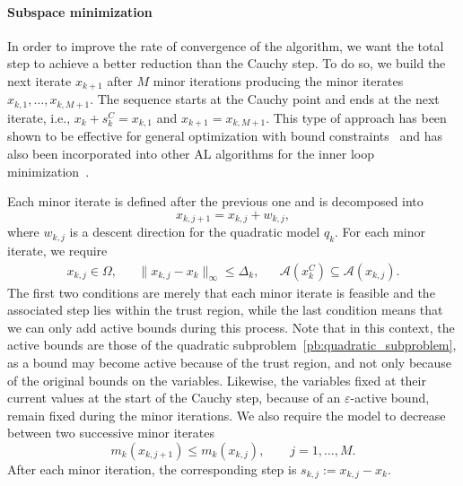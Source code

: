 \documentclass[pdflatex,sn-mathphys-num]{sn-jnl}%
\theoremstyle{thmstyleone}%
\newcommand{\calA}{{\mathcal{A}}}
\begin{document}
\paragraph*{Subspace minimization} In order to improve the rate of convergence of the algorithm, we want the total step to achieve a better reduction than the Cauchy step. To do so, we build the next iterate $x_{k+1}$ after $M$ minor iterations producing the minor iterates $x_{k,1},\ldots,x_{k,M+1}$. The sequence starts at the Cauchy point and ends at the next iterate, i.e., $x_{k}+s_k^C=x_{k,1}$ and $x_{k+1}=x_{k,M+1}$. This type of approach has been shown to be effective for general optimization with bound constraints~\cite{linmore:1999a} and has also been incorporated into other AL algorithms for the inner loop minimization~\cite{conn-etal:1992,arreckx-etal:2016}.

Each minor iterate is defined after the previous one and is decomposed into 
\[x_{k,j+1}=x_{k,j}+w_{k,j},\]
where $w_{k,j}$ is a descent direction for the quadratic model $q_k$. For each minor iterate, we require
\begin{equation}\label{eq:minor_iterate_feasible}
	\begin{aligned}
		x_{k,j} \in \Omega, & & \|x_{k,j} - x_k \|_\infty \le \Delta_k, & & \calA(x_k^C) \subseteq \calA(x_{k,j}).
	\end{aligned}
\end{equation}
The first two conditions are merely that each minor iterate is feasible and the associated step lies within the trust region, while the last condition means that we can only add active bounds during this process. Note that in this context, the active bounds are those of the quadratic subproblem~\eqref{pb:quadratic_subproblem}, as a bound may become active because of the trust region, and not only because of the original bounds on the variables. Likewise, the variables fixed at their current values at the start of the Cauchy step, because of an $\varepsilon$-active bound, remain fixed during the minor iterations.
We also require the model to decrease between two successive minor iterates
\begin{equation}\label{eq:minor_iterate_decrease}
	m_k(x_{k,j+1}) \le m_k(x_{k,j}), \qquad j = 1,\ldots,M.
\end{equation}
After each minor iteration, the corresponding step is $s_{k,j}:=x_{k,j}-x_k$.
\end{document}
